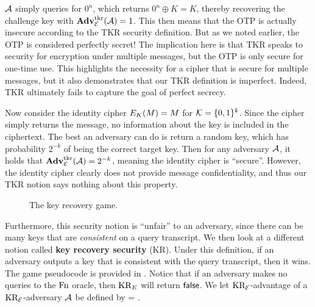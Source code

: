 ${\mathcal A}$ simply queries for $0^n$, which returns $0^n \oplus K = K$, thereby recovering the challenge key with $\mathbf{Adv}^{\mathrm{tkr}}_{{\cal E}}({\mathcal A}) = 1$. This then means that the OTP is actually insecure according to the TKR security definition. But as we noted earlier, the OTP is considered perfectly secret! The implication here is that TKR speaks to security for encryption under multiple messages, but the OTP is only secure for one-time use. This highlights the necessity for a cipher that is secure for multiple messages, but it also demonstrates that our TKR definition is imperfect. Indeed, TKR ultimately fails to capture the goal of perfect secrecy. 

Now consider the identity cipher $E_{K}(M) = M$ for ${\cal K}=\{0,1\}^k$. Since the cipher simply returns the message, no information about the key is included in the ciphertext. The best an adversary can do is return a random key, which has probability $2^{-k}$ of being the correct target key.
Then for any adversary ${\mathcal A}$, it holds that $\mathbf{Adv}^{\mathrm{tkr}}_{{\cal E}}({\mathcal A}) = 2^{-k}$, meaning the identity cipher is ``secure''. However, the identity cipher clearly does not provide message confidentiality, and thus our TKR notion says nothing about this property.

\begin{wrapfigure}[17]{r}{0pt}
	\caption{The key recovery game.}
	\label{fig:kr}
\end{wrapfigure}

Furthermore, this security notion is ``unfair'' to an adversary, since there can be many keys that are \textit{consistent} on a query transcript. We then look at a different notion called \textbf{key recovery security} (KR). Under this definition, if an adversary outputs a key that is consistent with the query transcript, then it wins. The game pseudocode is provided in . Notice that if an adversary makes no queries to the $\textnormal{Fn}$ oracle, then $\textnormal{KR}_E$ will return $\mathsf{false}$.
We let $\textnormal{KR}_{\cal E}$-advantage of a $\textnormal{KR}_{\cal E}$-adversary ${\mathcal A}$ be defined by 
\bnm
\AdvKR{\cipher}{\advA} = \Prob{\KR^\advA_\cipherE \Rightarrow\true}  \;.
\enm

